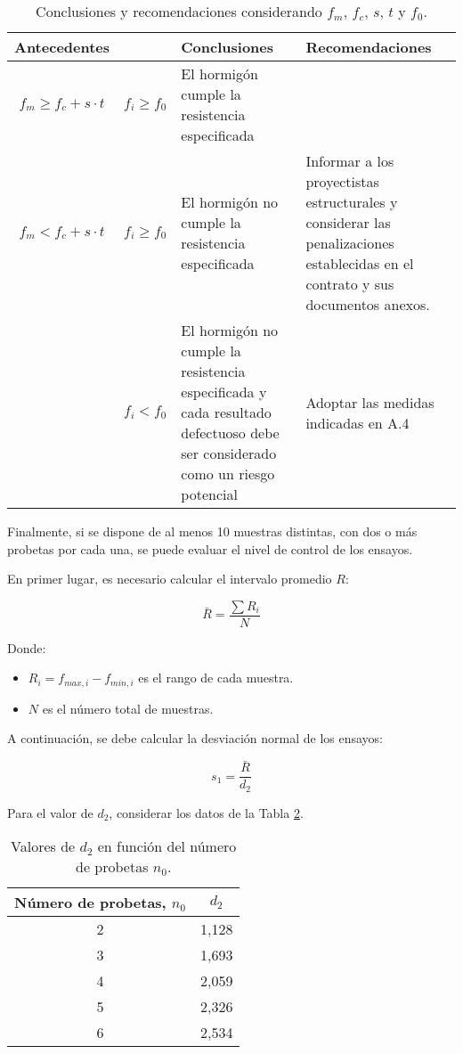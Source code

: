 \begin{table}[H]
\centering
\begin{tabular}{|c|c|p{6cm}|p{6cm}|}
\hline
\textbf{Antecedentes} &  & \textbf{Conclusiones} & \textbf{Recomendaciones} \\ \hline
$f_{m} \geq f_{c} + s \cdot t$ & $f_{i} \geq f_{0}$ & 
El hormigón cumple la resistencia especificada & \\ \hline

$f_{m} < f_{c} + s \cdot t$ & $f_{i} \geq f_{0}$ & 
El hormigón no cumple la resistencia especificada & 
Informar a los proyectistas estructurales y considerar las penalizaciones establecidas en el contrato y sus documentos anexos. \\ \hline

 & $f_{i} < f_{0}$ & 
El hormigón no cumple la resistencia especificada y cada resultado defectuoso debe ser considerado como un riesgo potencial & 
Adoptar las medidas indicadas en A.4 \\ \hline
\end{tabular}
\caption{Conclusiones y recomendaciones considerando $f_{m}$, $f_{c}$, $s$, $t$ y $f_{0}$.}
\label{tab:conclusiones2}
\end{table}

Finalmente, si se dispone de al menos 10 muestras distintas, con dos o más probetas por cada una, se puede evaluar el nivel de control de los ensayos.

En primer lugar, es necesario calcular el intervalo promedio $R$:

\begin{equation}
    \bar{R} = \frac{\sum R_i}{N}
\end{equation}

Donde:

\begin{itemize}
    \item $R_i = f_{max,i} - f_{min,i}$ es el rango de cada muestra.
    \item $N$ es el número total de muestras.
\end{itemize}

A continuación, se debe calcular la desviación normal de los ensayos:

\begin{equation}
    s_1 = \frac{\bar{R}}{d_2}
\end{equation}

Para el valor de $d_2$, considerar los datos de la Tabla \ref{tab:d2}.

\begin{table}[H]
\centering
\begin{tabular}{|c|c|}
\hline
\textbf{Número de probetas, $n_{0}$} & \textbf{$d_{2}$} \\ \hline
2 & 1,128 \\ \hline
3 & 1,693 \\ \hline
4 & 2,059 \\ \hline
5 & 2,326 \\ \hline
6 & 2,534 \\ \hline
\end{tabular}
\caption{Valores de $d_{2}$ en función del número de probetas $n_{0}$.}
\label{tab:d2}
\end{table}

